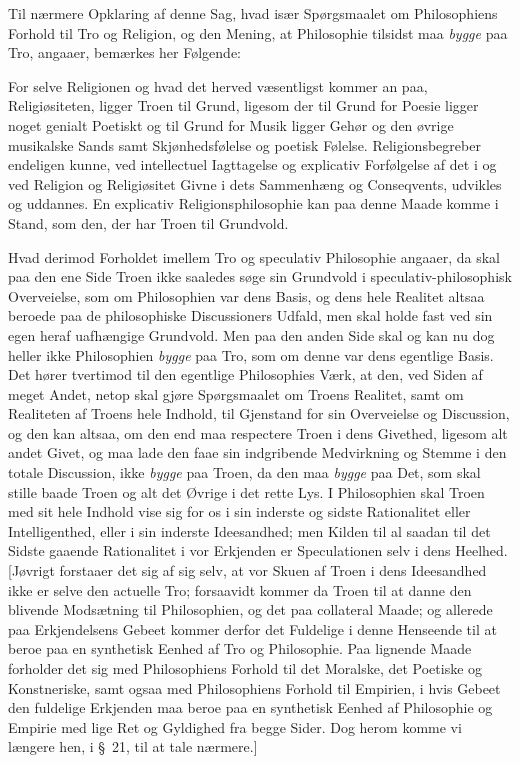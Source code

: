 \documentclass[12pt,a4paper]{book}
\newcommand{\apage}[1]{\marginnote{\footnotesize\textit{[#1]}}}
\begin{document}
Til nærmere Opklaring af denne Sag, hvad især Spørgsmaalet om Philosophiens Forhold
til Tro og Religion, og den Mening, at Philosophie tilsidst maa \emph{bygge} paa Tro,
angaaer, bemærkes her Følgende:

For selve Religionen og hvad det herved væsentligst kommer an paa, Religiøsiteten,
ligger Troen til Grund, ligesom der til Grund for Poesie ligger noget genialt
Poetiskt og til Grund for Musik ligger Gehør og den øvrige musikalske Sands samt
Skjønhedsfølelse og poetisk Følelse. Religionsbegreber endeligen kunne, ved
intellectuel Iagttagelse og explicativ Forfølgelse af det i og ved Religion og
Religiøsitet Givne i dets Sammenhæng og Conseqvents, udvikles og uddannes. En
explicativ Religionsphilosophie kan paa denne Maade komme i Stand, som den, der har
Troen til Grundvold.

Hvad derimod Forholdet imellem Tro og speculativ Philosophie angaaer, da skal paa
den ene Side Troen ikke saaledes søge sin Grundvold i speculativ-philosophisk
Overveielse, som om Philosophien var dens Basis, og dens hele Realitet altsaa
beroede paa de philosophiske Discussioners Udfald, men skal holde fast ved sin egen
heraf uafhængige Grundvold. Men paa den anden Side skal og kan nu dog heller ikke
Philosophien \emph{bygge}  \apage{66} paa Tro, som om denne var dens egentlige Basis. Det hører
tvertimod til den egentlige Philosophies Værk, at den, ved Siden af meget Andet,
netop skal gjøre Spørgsmaalet om Troens Realitet, samt om Realiteten af Troens hele
Indhold, til Gjenstand for sin Overveielse og Discussion, og den kan altsaa, om den
end maa respectere Troen i dens Givethed, ligesom alt andet Givet, og maa lade den
faae sin indgribende Medvirkning og Stemme i den totale Discussion, ikke \emph{bygge}
paa Troen, da den maa \emph{bygge} paa Det, som skal stille baade Troen og alt det
Øvrige i det rette Lys. I Philosophien skal Troen med sit hele Indhold vise sig for
os i sin inderste og sidste Rationalitet eller Intelligenthed, eller i sin inderste
Ideesandhed; men Kilden til al saadan til det Sidste gaaende Rationalitet i vor
Erkjenden er Speculationen selv i dens Heelhed. [Jøvrigt forstaaer det sig af sig
selv, at vor Skuen af Troen i dens Ideesandhed ikke er selve den actuelle Tro;
forsaavidt kommer da Troen til at danne den blivende Modsætning til Philosophien, og
det paa collateral Maade; og allerede paa Erkjendelsens Gebeet kommer derfor det
Fuldelige i denne Henseende til at beroe paa en synthetisk Eenhed af Tro og
Philosophie. Paa lignende Maade forholder det sig med Philosophiens Forhold til det
Moralske, det Poetiske og Konstneriske, samt ogsaa med Philosophiens Forhold til
Empirien, i hvis Gebeet den fuldelige Erkjenden maa beroe paa en synthetisk Eenhed
af Philosophie og Empirie med lige Ret og Gyldighed fra begge Sider. Dog herom komme
vi længere hen, i \S~21, til at tale nærmere.]
\end{document}

